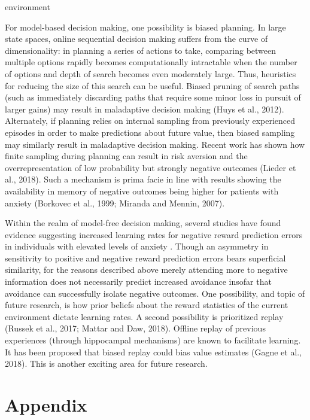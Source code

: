 environment\documentclass[11pt]{article} %
\begin{document}
For model-based decision making, one possibility is biased planning. In large
state spaces, online sequential decision making suffers from the curve of
dimensionality: in planning a series of actions to take, comparing between
multiple options rapidly becomes computationally intractable when the number of
options and depth of search becomes even moderately large. Thus, heuristics for
reducing the size of this search can be useful. Biased pruning of search paths
(such as immediately discarding paths that require some minor loss in pursuit of
larger gains) may result in maladaptive decision making (Huys et al., 2012).
Alternately, if planning relies on internal sampling from previously experienced
episodes in order to make predictions about future value, then biased sampling
may similarly result in maladaptive decision making. Recent work has shown how
finite sampling during planning can result in risk aversion and the overrepresentation
of low probability but strongly negative outcomes (Lieder et al., 2018). Such a
mechanism is prima facie in line with results showing the availability in memory
of negative outcomes being higher for patients with anxiety (Borkovec et al., 1999;
Miranda and Mennin, 2007).

Within the realm of model-free decision making, several studies have found evidence
suggesting increased learning rates for negative reward prediction errors in
individuals with elevated levels of anxiety \citep{Aylward, Huang2017, Harle2017
garrett2018}. Though an asymmetry in sensitivity to
positive and negative reward prediction errors bears superficial similarity, for
the reasons described above merely attending more to negative information does not
necessarily predict increased avoidance insofar that avoidance can successfully
isolate negative outcomes. One possibility, and topic of future research, is how
prior beliefs about the reward statistics of the current environment dictate
learning rates. A second possibility is prioritized replay (Russek et al., 2017;
Mattar and Daw, 2018). Offline replay of previous experiences (through hippocampal
mechanisms) are known to facilitate learning. It has been proposed that biased
replay could bias value estimates (Gagne et al., 2018). This is another exciting
area for future research.





\section{Appendix}
\end{document}
